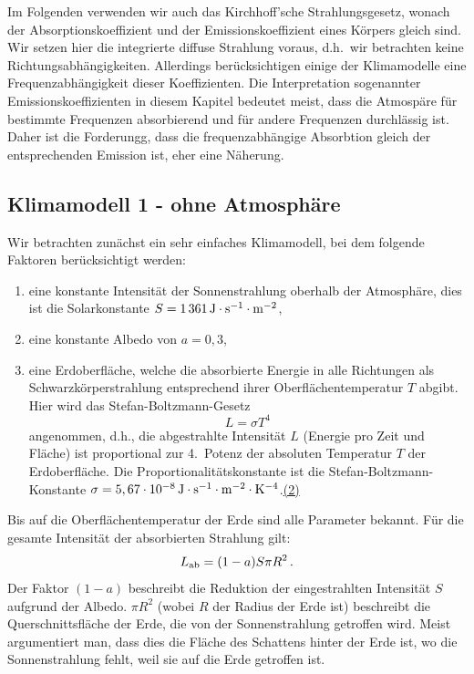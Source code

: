 Im Folgenden verwenden wir auch das Kirchhoff'sche Strahlungsgesetz, wonach der
Absorptionskoeffizient und der Emissionskoeffizient eines K\"orpers gleich sind. Wir setzen
hier die integrierte diffuse Strahlung voraus, d.h.\ wir betrachten keine Richtungsabh\"angigkeiten. 
Allerdings ber\"ucksichtigen einige der Klimamodelle eine Frequenzabh\"angigkeit dieser
Koeffizienten. Die Interpretation sogenannter Emissionskoeffizienten in diesem Kapitel
bedeutet meist, dass die Atmosp\"are f\"ur bestimmte Frequenzen
absorbierend und f\"ur andere Frequenzen durchl\"assig ist. Daher ist die Forderungg, dass
die frequenzabh\"angige Absorbtion gleich der entsprechenden Emission ist, eher eine
N\"aherung. 


\subsection{Klimamodell 1 - ohne Atmosph\"are}

Wir betrachten zun\"achst ein sehr einfaches Klimamodell, bei dem folgende Faktoren
ber\"ucksichtigt werden:
\begin{enumerate}
\item
eine konstante Intensit\"at der Sonnenstrahlung oberhalb der Atmosph\"are, dies ist die Solarkonstante 
$S=1\,361\,{\rm J\cdot s^{-1} \cdot m^{-2}}$,
\item
eine konstante Albedo von $a=0,3$,
\item
eine Erdoberfl\"ache, welche die absorbierte Energie in alle Richtungen als
Schwarzk\"orperstrahlung entsprechend ihrer Oberfl\"achentemperatur $T$ abgibt. 
Hier wird das Stefan-Boltzmann-Gesetz 
\begin{equation}
                L=\sigma T^4
\end{equation}                 
angenommen, d.h., die abgestrahlte Intensit\"at $L$ (Energie pro Zeit und Fl\"ache) ist 
proportional zur 4.\ Potenz der
absoluten Temperatur $T$ der Erdoberfl\"ache.
Die Proportionalit\"atskonstante ist die Stefan-Boltzmann-Konstante
$\sigma = 5,67 \cdot 10^{-8}\,{\rm J \cdot {s}^{-1} \cdot m^{-2} \cdot K^{-4}}$.\hyperref[Anm-2]{(2)}  
\end{enumerate}
Bis auf die Oberfl\"achentemperatur der Erde sind alle Parameter bekannt. F\"ur die
gesamte Intensit\"at der absorbierten Strahlung gilt:
\begin{equation}
          L_{\rm ab} = (1 - a ) S \pi R^2 \, .
\end{equation}
Der Faktor $(1-a)$ beschreibt die Reduktion der eingestrahlten Intensit\"at $S$ aufgrund
der Albedo. $\pi R^2$ (wobei $R$ der Radius der Erde ist) beschreibt die Querschnittsfl\"ache
der Erde, die von der Sonnenstrahlung getroffen wird. Meist argumentiert man, dass dies die
Fl\"ache des Schattens hinter der Erde ist, wo die Sonnenstrahlung fehlt, weil sie auf die
Erde getroffen ist. 

